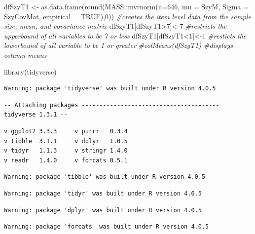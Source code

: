 \documentclass[
  english,
]{book}
\newenvironment{Shaded}{\begin{snugshade}}{\end{snugshade}}
\newcommand{\AttributeTok}[1]{\textcolor[rgb]{0.77,0.63,0.00}{#1}}
\newcommand{\CommentTok}[1]{\textcolor[rgb]{0.56,0.35,0.01}{\textit{#1}}}
\newcommand{\ConstantTok}[1]{\textcolor[rgb]{0.00,0.00,0.00}{#1}}
\newcommand{\DecValTok}[1]{\textcolor[rgb]{0.00,0.00,0.81}{#1}}
\newcommand{\FunctionTok}[1]{\textcolor[rgb]{0.00,0.00,0.00}{#1}}
\newcommand{\NormalTok}[1]{#1}
\newcommand{\OtherTok}[1]{\textcolor[rgb]{0.56,0.35,0.01}{#1}}
\newcommand{\SpecialCharTok}[1]{\textcolor[rgb]{0.00,0.00,0.00}{#1}}
\begin{document}
\begin{Shaded}
\begin{Highlighting}[]
\NormalTok{dfSzyT1 }\OtherTok{\textless{}{-}} \FunctionTok{as.data.frame}\NormalTok{(}\FunctionTok{round}\NormalTok{(MASS}\SpecialCharTok{::}\FunctionTok{mvrnorm}\NormalTok{(}\AttributeTok{n=}\DecValTok{646}\NormalTok{, }\AttributeTok{mu =}\NormalTok{ SzyM, }\AttributeTok{Sigma =}\NormalTok{ SzyCovMat, }\AttributeTok{empirical =} \ConstantTok{TRUE}\NormalTok{),}\DecValTok{0}\NormalTok{)) }\CommentTok{\#creates the item level data from the sample size, mean, and covariance matrix}
\NormalTok{dfSzyT1[dfSzyT1}\SpecialCharTok{\textgreater{}}\DecValTok{7}\NormalTok{]}\OtherTok{\textless{}{-}}\DecValTok{7} \CommentTok{\#restricts the upperbound of all variables to be 7 or less}
\NormalTok{dfSzyT1[dfSzyT1}\SpecialCharTok{\textless{}}\DecValTok{1}\NormalTok{]}\OtherTok{\textless{}{-}}\DecValTok{1} \CommentTok{\#resticts the lowerbound of all variable to be 1 or greater}
\CommentTok{\#colMeans(dfSzyT1) \#displays column means}

\FunctionTok{library}\NormalTok{(tidyverse)}
\end{Highlighting}
\end{Shaded}

\begin{verbatim}
Warning: package 'tidyverse' was built under R version 4.0.5
\end{verbatim}

\begin{verbatim}
-- Attaching packages --------------------------------------- tidyverse 1.3.1 --
\end{verbatim}

\begin{verbatim}
v ggplot2 3.3.3     v purrr   0.3.4
v tibble  3.1.1     v dplyr   1.0.5
v tidyr   1.1.3     v stringr 1.4.0
v readr   1.4.0     v forcats 0.5.1
\end{verbatim}

\begin{verbatim}
Warning: package 'tibble' was built under R version 4.0.5
\end{verbatim}

\begin{verbatim}
Warning: package 'tidyr' was built under R version 4.0.5
\end{verbatim}

\begin{verbatim}
Warning: package 'dplyr' was built under R version 4.0.5
\end{verbatim}

\begin{verbatim}
Warning: package 'forcats' was built under R version 4.0.5
\end{verbatim}
\end{document}

